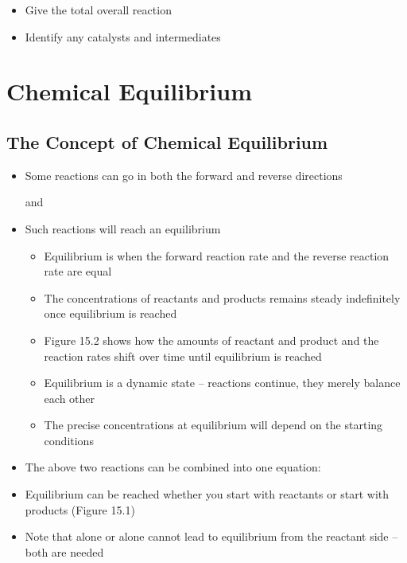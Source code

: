 \documentclass[12pt, openany, letterpaper]{memoir}
\begin{document}
\begin{itemize}
	
	
	\begin{itemize}
		\item Give the total overall reaction
		\item Identify any catalysts and intermediates
	\end{itemize}
\end{itemize}

\chapter{Chemical Equilibrium}
\section{The Concept of Chemical Equilibrium}
\begin{itemize}
	\item Some reactions can go in both the forward and reverse directions
	
	 and 
	\item Such reactions will reach an equilibrium
	\begin{itemize}
		\item Equilibrium is when the forward reaction rate and the reverse reaction rate are equal
		\item The concentrations of reactants and products remains steady indefinitely once equilibrium is reached
		\item Figure 15.2 shows how the amounts of reactant and product and the reaction rates shift over time until equilibrium is reached
		\item Equilibrium is a dynamic state -- reactions continue, they merely balance each other
		\item The precise concentrations at equilibrium will depend on the starting conditions
	\end{itemize}
	\item The above two reactions can be combined into one equation: 
	\item Equilibrium can be reached whether you start with reactants or start with products (Figure 15.1)
	\item Note that  alone or  alone cannot lead to equilibrium from the reactant side -- both are needed
\end{itemize}
\end{document}
